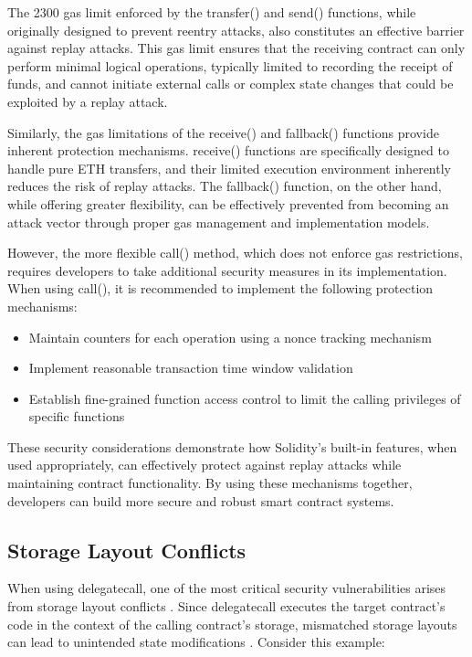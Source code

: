 \documentclass[conference]{IEEEtran}
\begin{document}
The 2300 gas limit enforced by the transfer() and send() functions, while originally designed to prevent reentry attacks, also constitutes an effective barrier against replay attacks. This gas limit ensures that the receiving contract can only perform minimal logical operations, typically limited to recording the receipt of funds, and cannot initiate external calls or complex state changes that could be exploited by a replay attack.

Similarly, the gas limitations of the receive() and fallback() functions provide inherent protection mechanisms. receive() functions are specifically designed to handle pure ETH transfers, and their limited execution environment inherently reduces the risk of replay attacks. The fallback() function, on the other hand, while offering greater flexibility, can be effectively prevented from becoming an attack vector through proper gas management and implementation models.

However, the more flexible call() method, which does not enforce gas restrictions, requires developers to take additional security measures in its implementation. When using call(), it is recommended to implement the following protection mechanisms:
\begin{itemize}
\item Maintain counters for each operation using a nonce tracking mechanism

\item Implement reasonable transaction time window validation

\item Establish fine-grained function access control to limit the calling privileges of specific functions
\end{itemize}

These security considerations demonstrate how Solidity's built-in features, when used appropriately, can effectively protect against replay attacks while maintaining contract functionality. By using these mechanisms together, developers can build more secure and robust smart contract systems.

\vspace{1em}
\subsection{Storage Layout Conflicts}
When using delegatecall, one of the most critical security vulnerabilities arises from storage layout conflicts \cite{storageLayout}. Since delegatecall executes the target contract's code in the context of the calling contract's storage, mismatched storage layouts can lead to unintended state modifications \cite{proxyPatterns}. Consider this example:
\end{document}
